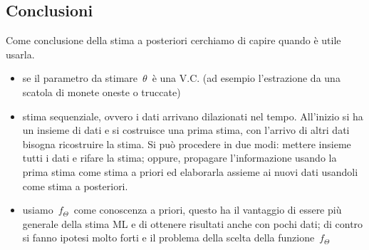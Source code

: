 \subsection{Conclusioni}
Come conclusione della stima a posteriori cerchiamo di capire quando è utile usarla.

  \begin{itemize}
    \item se il parametro da stimare $\theta$ è una V.C. (ad esempio l'estrazione da una scatola di monete oneste o truccate) 
    \item stima sequenziale, ovvero i dati arrivano dilazionati nel tempo. All'inizio si ha un insieme di dati e si costruisce una prima stima, con l'arrivo di altri dati bisogna ricostruire la stima. Si può procedere in due modi: mettere insieme tutti i dati e rifare la stima; oppure, propagare l'informazione usando la prima stima come stima a priori ed elaborarla assieme ai nuovi dati usandoli come stima a posteriori. 
    \item usiamo $f_{\Theta}$ come conoscenza a priori, questo ha il vantaggio di essere più generale della stima ML e di ottenere risultati anche con pochi dati; di contro si fanno ipotesi molto forti e il problema della scelta della funzione $f_{\Theta}$ 
  \end{itemize}
